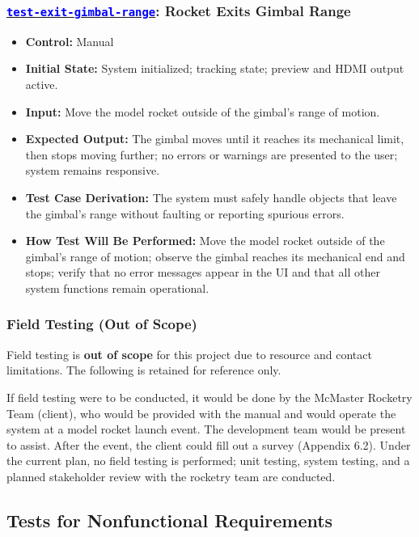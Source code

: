 \documentclass[12pt, titlepage]{article}
\newcommand{\tid}[1]{\hyperlink{tid:#1}{\textcolor{blue}{\texttt{#1}}}}
\begin{document}
\subsubsection*{\tid{test-exit-gimbal-range}: Rocket Exits Gimbal Range}
\begin{itemize}
  \item \textbf{Control:} Manual
  \item \textbf{Initial State:} System initialized; tracking state; preview and HDMI output active.
  \item \textbf{Input:} Move the model rocket outside of the gimbal's range of motion.
  \item \textbf{Expected Output:} The gimbal moves until it reaches its mechanical limit, then stops moving further; no errors or warnings are presented to the user; system remains responsive.
  \item \textbf{Test Case Derivation:} The system must safely handle objects that leave the gimbal's range without faulting or reporting spurious errors.
  \item \textbf{How Test Will Be Performed:} Move the model rocket outside of the gimbal's range of motion; observe the gimbal reaches its mechanical end and stops; verify that no error messages appear in the UI and that all other system functions remain operational.
\end{itemize}

\subsubsection{Field Testing (Out of Scope)}

Field testing is \textbf{out of scope} for this project due to resource and
contact limitations. The following is retained for reference only.

If field testing were to be conducted, it would be done by the McMaster
Rocketry Team (client), who would be provided with the manual and would operate
the system at a model rocket launch event. The development team would be
present to assist. After the event, the client could fill out a survey
(Appendix 6.2). Under the current plan, no field testing is performed; unit
testing, system testing, and a planned stakeholder review with the rocketry
team are conducted.

\subsection{Tests for Nonfunctional Requirements}
\end{document}
